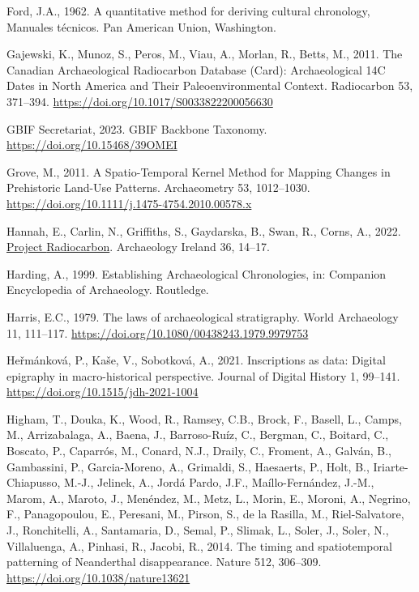 \documentclass[
  number,
  doubleblind]{elsarticle}
\newlength{\cslhangindent}
\newenvironment{CSLReferences}[2] %
 {\begin{list}{}{%
  \setlength{\itemindent}{0pt}
  \setlength{\leftmargin}{0pt}
  \setlength{\parsep}{0pt}
  \ifodd #1
   \setlength{\leftmargin}{\cslhangindent}
   \setlength{\itemindent}{-1\cslhangindent}
  \fi
  \setlength{\itemsep}{#2\baselineskip}}}
 {\end{list}}
\begin{document}
\begin{CSLReferences}{1}{0}
Ford, J.A., 1962. A quantitative method for deriving cultural
chronology, Manuales técnicos. Pan American Union, Washington.

Gajewski, K., Munoz, S., Peros, M., Viau, A., Morlan, R., Betts, M.,
2011. The {Canadian Archaeological Radiocarbon Database} ({Card}):
{Archaeological 14C Dates} in {North America} and {Their
Paleoenvironmental Context}. Radiocarbon 53, 371--394.
\url{https://doi.org/10.1017/S0033822200056630}

GBIF Secretariat, 2023. {GBIF Backbone Taxonomy}.
\url{https://doi.org/10.15468/39OMEI}

Grove, M., 2011. A {Spatio-Temporal Kernel Method} for {Mapping Changes}
in {Prehistoric Land-Use Patterns}. Archaeometry 53, 1012--1030.
\url{https://doi.org/10.1111/j.1475-4754.2010.00578.x}

Hannah, E., Carlin, N., Griffiths, S., Gaydarska, B., Swan, R., Corns,
A., 2022. \href{https://www.jstor.org/stable/27198744}{Project
{Radiocarbon}}. Archaeology Ireland 36, 14--17.

Harding, A., 1999. Establishing {Archaeological Chronologies}, in:
Companion {Encyclopedia} of {Archaeology}. Routledge.

Harris, E.C., 1979. The laws of archaeological stratigraphy. World
Archaeology 11, 111--117.
\url{https://doi.org/10.1080/00438243.1979.9979753}

Heřmánková, P., Kaše, V., Sobotková, A., 2021. Inscriptions as data:
Digital epigraphy in macro-historical perspective. Journal of Digital
History 1, 99--141. \url{https://doi.org/10.1515/jdh-2021-1004}

Higham, T., Douka, K., Wood, R., Ramsey, C.B., Brock, F., Basell, L.,
Camps, M., Arrizabalaga, A., Baena, J., Barroso-Ruíz, C., Bergman, C.,
Boitard, C., Boscato, P., Caparrós, M., Conard, N.J., Draily, C.,
Froment, A., Galván, B., Gambassini, P., Garcia-Moreno, A., Grimaldi,
S., Haesaerts, P., Holt, B., Iriarte-Chiapusso, M.-J., Jelinek, A.,
Jordá Pardo, J.F., Maíllo-Fernández, J.-M., Marom, A., Maroto, J.,
Menéndez, M., Metz, L., Morin, E., Moroni, A., Negrino, F.,
Panagopoulou, E., Peresani, M., Pirson, S., de la Rasilla, M.,
Riel-Salvatore, J., Ronchitelli, A., Santamaria, D., Semal, P., Slimak,
L., Soler, J., Soler, N., Villaluenga, A., Pinhasi, R., Jacobi, R.,
2014. The timing and spatiotemporal patterning of {Neanderthal}
disappearance. Nature 512, 306--309.
\url{https://doi.org/10.1038/nature13621}


\end{CSLReferences}
\end{document}

